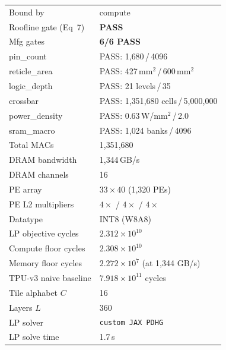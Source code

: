 \begin{table}[h]
\begin{tabular}{@{}ll@{}}
Bound by                & compute \\
Roofline gate (Eq~7)    & \textcolor{green!60!black}{\textbf{PASS}} \\
\midrule
Mfg gates               & \textcolor{green!60!black}{\textbf{6/6 PASS}} \\
\quad pin\_count         & PASS: 1{,}680\,/\,4096 \\
\quad reticle\_area      & PASS: 427\,mm$^2$\,/\,600\,mm$^2$ \\
\quad logic\_depth       & PASS: 21 levels\,/\,35 \\
\quad crossbar           & PASS: 1{,}351{,}680 cells\,/\,5{,}000{,}000 \\
\quad power\_density     & PASS: 0.63\,W/mm$^2$\,/\,2.0 \\
\quad sram\_macro        & PASS: 1{,}024 banks\,/\,4096 \\
\midrule
Total MACs              & 1{,}351{,}680 \\
DRAM bandwidth          & 1{,}344\,GB/s \\
DRAM channels           & 16 \\
PE array                & $33 \times 40$ (1{,}320 PEs) \\
PE L2 multipliers       & $4\times$ / $4\times$ / $4\times$ \\
Datatype                & INT8 (W8A8) \\
LP objective cycles     & $2.312 \times 10^{10}$ \\
Compute floor cycles    & $2.308 \times 10^{10}$ \\
Memory floor cycles     & $2.272 \times 10^{7}$ (at 1{,}344 GB/s) \\
TPU-v3 naive baseline   & $7.918 \times 10^{11}$ cycles \\
Tile alphabet $C$       & 16 \\
Layers $L$              & 360 \\
LP solver               &  \texttt{custom JAX PDHG}\\
LP solve time           & 1.7\,s \\
\bottomrule
\end{tabular}
\end{table}


